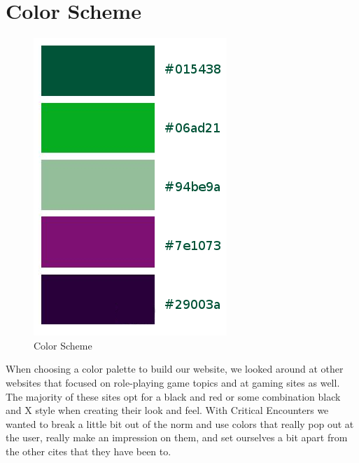 \documentclass[12pt,a4paper]{report}
\begin{document}
	\section{Color Scheme}
	\begin{figure}[H]
		\centering
		\includegraphics[scale=.5]{colors}
		\caption{Color Scheme}
		\label{fig: Color Scheme}
	\end{figure}
	When choosing a color palette to build our website, we looked around at other websites that focused on role-playing game topics and at gaming sites as well. The majority of these sites opt for a black and red or some combination black and X style when creating their look and feel. With Critical Encounters we wanted to break a little bit out of the norm and use colors that really pop out at the user, really make an impression on them, and set ourselves a bit apart from the other cites that they have been to.

	\newpage
\end{document}
